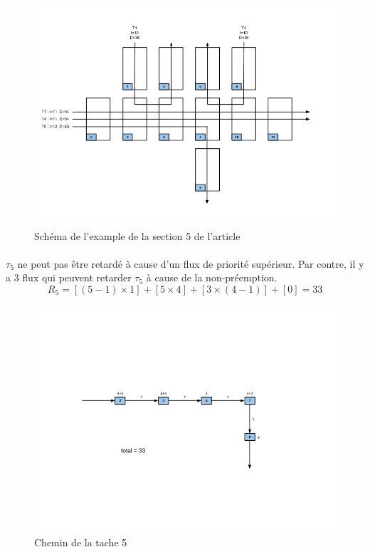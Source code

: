 \documentclass[10pt,a4paper]{article}
\newenvironment{figureH} {%
\begin{figure}[H]
}{%
\end{figure}
}
\begin{document}
\begin{figureH}
  \includegraphics[width=\textwidth]{images/global.png}
  \center
  \caption{Schéma de l'example de la section 5 de l'article}
  \label{image_global}
\end{figureH}

\paragraph{}
$\tau_5$ ne peut pas être retardé à cause d'un flux de priorité supérieur. Par contre, il y a 3 flux qui peuvent retarder $\tau_5$ à cause de la non-préemption.
\[ R_{5} = [(5-1) \times 1]  + [5 \times 4] + [3 \times (4-1)] + [0] = 33 \]

\begin{figureH}
  \includegraphics[width=\textwidth]{images/tache5.png}
  \center
  \caption{Chemin de la tache 5}
  \label{image_global}
\end{figureH}
\end{document}
